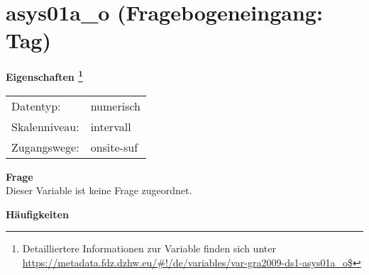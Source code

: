 
    \setcounter{footnote}{0}

    \vspace*{-1.8cm}
	\section{asys01a\_o (Fragebogeneingang: Tag)}
	\label{section:asys01a_o}



    \vspace*{0.5cm}
    \noindent\textbf{Eigenschaften
	\footnote{Detailliertere Informationen zur Variable finden sich unter
		\url{https://metadata.fdz.dzhw.eu/\#!/de/variables/var-gra2009-ds1-asys01a_o$}}}\\
	\begin{tabularx}{\hsize}{@{}lX}
	Datentyp: & numerisch \\
	Skalenniveau: & intervall \\
	Zugangswege: &
	  onsite-suf
 \\
    \end{tabularx}



		\vspace*{0.5cm}
		\noindent\textbf{Frage}\\
		Dieser Variable ist keine Frage zugeordnet.





        		\vspace*{0.5cm}
                \noindent\textbf{Häufigkeiten}

